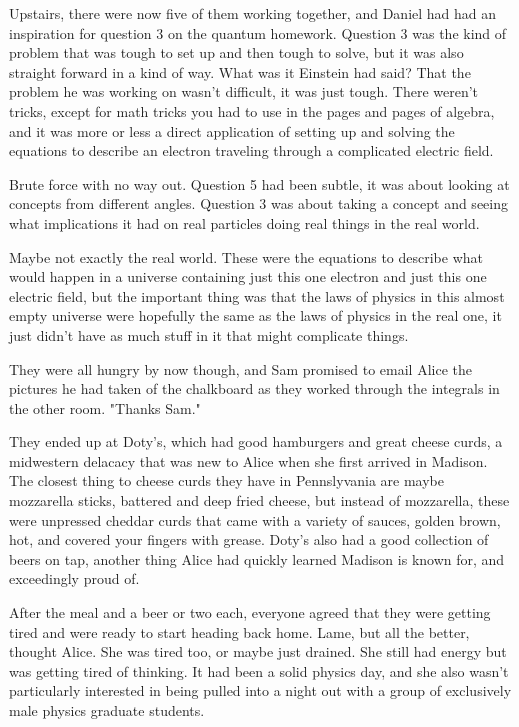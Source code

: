 \mypause

Upstairs, there were now five of them working together, and Daniel had had an inspiration for question 3 on the quantum homework. Question 3 was the kind of problem that was tough to set up and then tough to solve, but it was also straight forward in a kind of way. What was it Einstein had said? That the problem he was working on wasn't difficult, it was just tough. There weren't tricks, except for math tricks you had to use in the pages and pages of algebra, and it was more or less a direct application of setting up and solving the equations to describe an electron traveling through a complicated electric field. 

Brute force with no way out. Question 5 had been subtle, it was about looking at concepts from different angles. Question 3 was about taking a concept and seeing what implications it had on real particles doing real things in the real world. 

Maybe not exactly the real world. These were the equations to describe what would happen in a universe containing just this one electron and just this one electric field, but the important thing was that the laws of physics in this almost empty universe were hopefully the same as the laws of physics in the real one, it just didn't have as much stuff in it that might complicate things. 

They were all hungry by now though, and Sam promised to email Alice the pictures he had taken of the chalkboard as they worked through the integrals in the other room. "Thanks Sam."

\mypause

They ended up at Doty's, which had good hamburgers and great cheese curds, a midwestern delacacy that was new to Alice when she first arrived in Madison. The closest thing to cheese curds they have in Pennslyvania are maybe mozzarella sticks, battered and deep fried cheese, but instead of mozzarella, these were unpressed cheddar curds that came with a variety of sauces, golden brown, hot, and covered your fingers with grease. Doty's also had a good collection of beers on tap, another thing Alice had quickly learned Madison is known for, and exceedingly proud of.

After the meal and a beer or two each, everyone agreed that they were getting tired and were ready to start heading back home. Lame, but all the better, thought Alice. She was tired too, or maybe just drained. She still had energy but was getting tired of thinking. It had been a solid physics day, and she also wasn't particularly interested in being pulled into a night out with a group of exclusively male physics graduate students.

